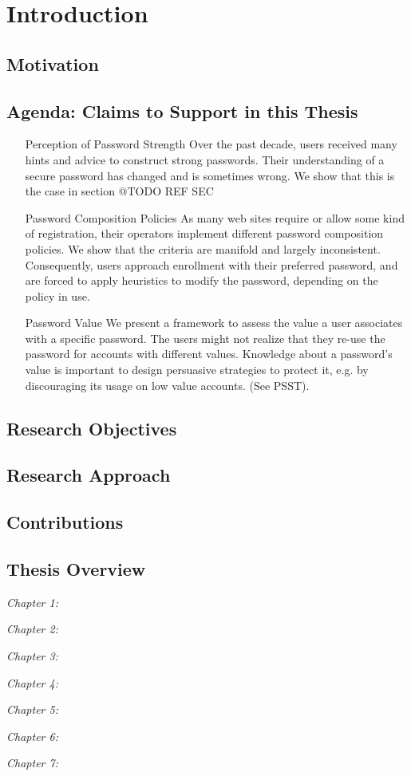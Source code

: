 
\chapter[Introduction]{Introduction}\label{chap:intro}


\section{Motivation}



\section{Agenda: Claims to Support in this Thesis}

\begin{itemize}

\item[Perception of Password Strength] Over the past decade, users received many hints and advice to construct strong passwords. Their understanding of a secure password has changed and is sometimes wrong. We show that this is the case in section @TODO REF SEC

\item[Password Composition Policies] As many web sites require or allow some kind of registration, their operators implement different password composition policies. We show that the criteria are manifold and largely inconsistent. Consequently, users approach enrollment with their preferred password, and are forced to apply heuristics to modify the password, depending on the policy in use. 

\item[Password Value] We present a framework to assess the value a user associates with a specific password. The users might not realize that they re-use the password for accounts with different values. Knowledge about a password's value is important to design persuasive strategies to protect it, e.g. by discouraging its usage on low value accounts. (See PSST).

\end{itemize}


\section{Research Objectives}

\section{Research Approach}

\section{Contributions}


\section{Thesis Overview}
\textit{Chapter 1:}

\textit{Chapter 2:}

\textit{Chapter 3:}

\textit{Chapter 4:}

\textit{Chapter 5:}

\textit{Chapter 6:}

\textit{Chapter 7:}




